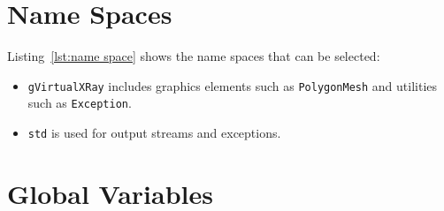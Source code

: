 \documentclass[11pt,oneside,a4paper,final]{article}
\begin{document}
\begin{center}

\end{center}


\section{Name Spaces}
\label{sec:Name Spaces}

Listing~\ref{lst:name space} shows the name spaces that can be selected:
\begin{itemize}
 \item \verb+gVirtualXRay+ includes graphics elements such as \verb+PolygonMesh+ 
	and utilities such as \verb+Exception+. 
 \item \verb+std+ is used for output streams and exceptions.
\end{itemize}

\begin{center}

\end{center}


\section{Global Variables}
\label{sec:Global Variables}
\end{document}
